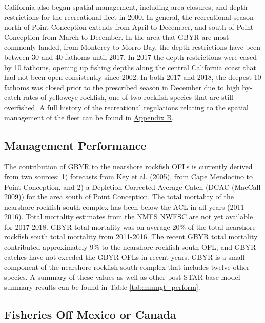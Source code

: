 \documentclass[12pt,]{article}
\begin{document}
California also began spatial management, including area closures, and
depth restrictions for the recreational fleet in 2000. In general, the
recreational season north of Point Conception extends from April to
December, and south of Point Conception from March to December. In the
area that GBYR are most commonly landed, from Monterey to Morro Bay, the
depth restrictions have been between 30 and 40 fathoms until 2017. In
2017 the depth restrictions were eased by 10 fathoms, opening up fishing
depths along the central California coast that had not been open
consistently since 2002. In both 2017 and 2018, the deepest 10 fathoms
was closed prior to the prescribed season in December due to high
by-catch rates of yelloweye rockfish, one of two rockfish species that
are still overfished. A full history of the recreational regulations
relating to the spatial management of the fleet can be found in
\protect\hyperlink{appendix-b.-californias-recreational-fishery-regulations}{Appendix
B}.

\subsection{Management Performance}\label{management-performance-1}

The contribution of GBYR to the nearshore rockfish OFLs is currently
derived from two sources: 1) forecasts from Key et al.
(\protect\hyperlink{ref-Key2005}{2005}), from Cape Mendocino to Point
Conception, and 2) a Depletion Corrected Average Catch (DCAC (MacCall
\protect\hyperlink{ref-MacCall2009}{2009})) for the area south of Point
Conception. The total mortality of the nearshore rockfish south complex
has been below the ACL in all years (2011-2016). Total mortality
estimates from the NMFS NWFSC are not yet available for 2017-2018. GBYR
total mortality was on average 20\% of the total nearshore rockfish
south total mortality from 2011-2016. The recent GBYR total mortality
contributed approximately 9\% to the nearshore rockfish south OFL, and
GBYR catches have not exceded the GBYR OFLs in recent years. GBYR is a
small component of the nearshore rockfish south complex that includes
twelve other species. A summary of these values as well as other
post-STAR base model summary results can be found in Table
\ref{tab:mnmgt_perform}.

\subsection{Fisheries Off Mexico or
Canada}\label{fisheries-off-mexico-or-canada}
\end{document}
